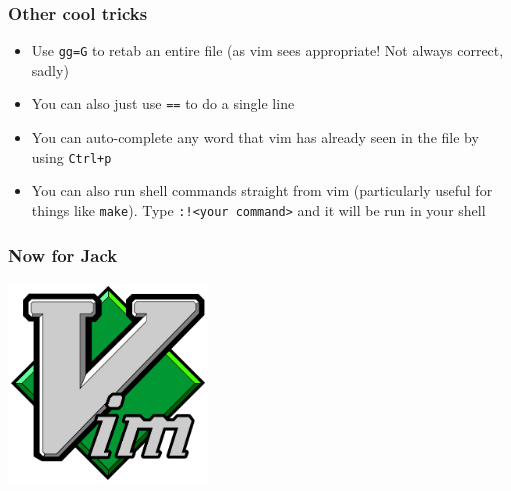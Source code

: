 \documentclass{beamer}
\begin{document}
\begin{frame}
    \frametitle{Other cool tricks}
    \pause
    \begin{itemize}
        \item Use \texttt{gg=G} to retab an entire file (as vim sees appropriate! Not always correct, sadly)
        \item You can also just use \texttt{==} to do a single line
        \pause
        \item You can auto-complete any word that vim has already seen in the file by using \texttt{Ctrl+p}
        \pause
        \item You can also run shell commands straight from vim (particularly useful for things like \texttt{make}). Type \texttt{:!<your command>} and it will be run in your shell
    \end{itemize}
\end{frame}

\begin{frame}
    \frametitle{Now for Jack}
    \centering
    \includegraphics[width=150pt]{./vimlogo.png}
\end{frame}
\end{document}
